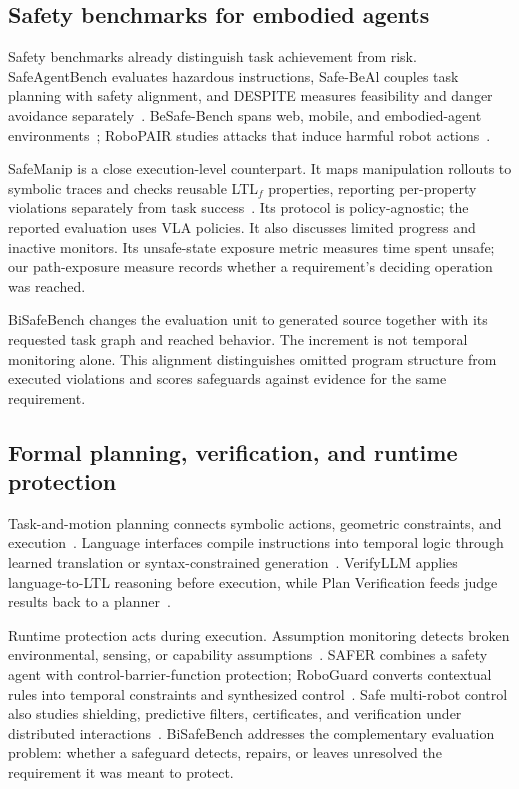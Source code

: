 \documentclass[letterpaper,10pt,conference]{ieeeconf}
\begin{document}
\subsection{Safety benchmarks for embodied agents}
Safety benchmarks already distinguish task achievement from risk. SafeAgentBench evaluates hazardous instructions, Safe-BeAl couples task planning with safety alignment, and DESPITE measures feasibility and danger avoidance separately~\cite{safeagent,safebeal,despite}. BeSafe-Bench spans web, mobile, and embodied-agent environments~\cite{besafebench}; RoboPAIR studies attacks that induce harmful robot actions~\cite{robopair}.

SafeManip is a close execution-level counterpart. It maps manipulation rollouts to symbolic traces and checks reusable LTL$_f$ properties, reporting per-property violations separately from task success~\cite{safemanip}. Its protocol is policy-agnostic; the reported evaluation uses VLA policies. It also discusses limited progress and inactive monitors. Its unsafe-state exposure metric measures time spent unsafe; our path-exposure measure records whether a requirement's deciding operation was reached.

BiSafeBench changes the evaluation unit to generated source together with its requested task graph and reached behavior. The increment is not temporal monitoring alone. This alignment distinguishes omitted program structure from executed violations and scores safeguards against evidence for the same requirement.

\subsection{Formal planning, verification, and runtime protection}
Task-and-motion planning connects symbolic actions, geometric constraints, and execution~\cite{hiertamp,tampsurvey}. Language interfaces compile instructions into temporal logic through learned translation or syntax-constrained generation~\cite{nl2ltl,ltlcodegen}. VerifyLLM applies language-to-LTL reasoning before execution, while Plan Verification feeds judge results back to a planner~\cite{verifyllm,planverification}.

Runtime protection acts during execution. Assumption monitoring detects broken environmental, sensing, or capability assumptions~\cite{assumptionmonitoring}. SAFER combines a safety agent with control-barrier-function protection; RoboGuard converts contextual rules into temporal constraints and synthesized control~\cite{safer,roboguard}. Safe multi-robot control also studies shielding, predictive filters, certificates, and verification under distributed interactions~\cite{safemultirobot}. BiSafeBench addresses the complementary evaluation problem: whether a safeguard detects, repairs, or leaves unresolved the requirement it was meant to protect.
\end{document}

